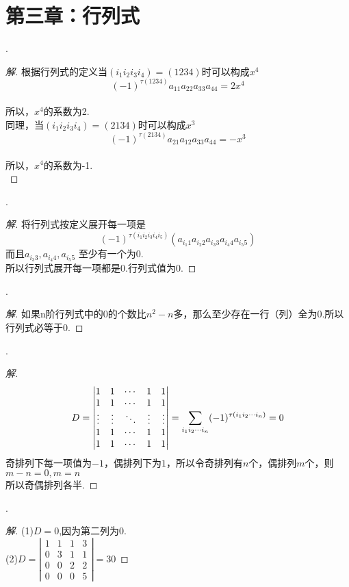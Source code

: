 \documentclass[10pt,a4paper]{report}
\title{}
\author{}
\date{}
\begin{document}
\chapter*{第三章：行列式}
.
\begin{proof}[解]
	根据行列式的定义当$(i_{1}i_{2}i_{3}i_{4}) = (1234)$时可以构成$x^{4}$\\
	$$(-1)^{\tau(1234)}a_{11}a_{22}a_{33}a_{44} = 2x^{4}$$\\
	所以，$x^{4}$的系数为2.\\
	同理，当$(i_{1}i_{2}i_{3}i_{4}) = (2134)$时可以构成$x^{3}$
	$$(-1)^{\tau(2134)}a_{21}a_{12}a_{33}a_{44} = -x^{3}$$\\
	所以，$x^{4}$的系数为-1.\\
\end{proof}
.
\begin{proof}[解]
	将行列式按定义展开每一项是
	$$(-1)^{\tau(i_{1}i_{2}i_{3}i_{4}i_{5})}(a_{i_{1}1}a_{i_{2}2}a_{i_{3}3}a_{i_{4}4}a_{i_{5}5})$$
	而且$a_{i_{3}3},a_{i_{4}4},a_{i_{5}5}$ 至少有一个为0.\\
	所以行列式展开每一项都是0.行列式值为0.
\end{proof}
.
\begin{proof}[解]
	如果n阶行列式中的0的个数比$n^{2}-n$多，那么至少存在一行（列）全为0.所以行列式必等于0.
\end{proof}
.
\begin{proof}[解]
	$$D = \left|
	\begin{matrix}
	1 & 1 & \cdots & 1 & 1\\
	1 & 1 & \cdots & 1 & 1\\
	\vdots & \vdots & \ddots & \vdots & \vdots\\
	1 & 1 & \cdots & 1 & 1 \\
	1 & 1 & \cdots & 1 & 1 
	\end{matrix}
	\right| = \sum_{i_{1}i_{2} \cdots i_{n}}(-1)^{\tau(i_{1}i_{2} \cdots i_{n})} = 0\\$$
	奇排列下每一项值为$-1$，偶排列下为$1$，所以令奇排列有$n$个，偶排列$m$个，则$m-n = 0, m=n$\\
	所以奇偶排列各半.
\end{proof}
.
\begin{proof}[解]
	(1)$D=0$,因为第二列为$0$.\\
	(2)$D=\left|
	\begin{matrix}
	1 & 1 & 1 & 3\\
	0 & 3 & 1 & 1\\
	0 & 0 & 2 & 2 \\
	0 & 0 & 0 & 5 
	\end{matrix}
	\right| = 30$
\end{proof}
\end{document}

